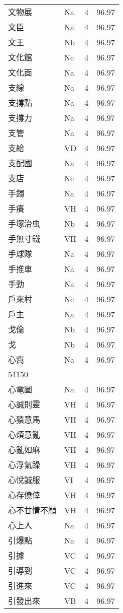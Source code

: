\documentclass[twocolumn]{book}
\begin{document}
\begin{supertabular}{llrr}
文物展 & Na & 4 &  96.97\\
文臣 & Na & 4 &  96.97\\
文王 & Nb & 4 &  96.97\\
文化館 & Nc & 4 &  96.97\\
文化面 & Na & 4 &  96.97\\
支線 & Na & 4 &  96.97\\
支撐點 & Na & 4 &  96.97\\
支撐力 & Na & 4 &  96.97\\
支管 & Na & 4 &  96.97\\
支給 & VD & 4 &  96.97\\
支配國 & Na & 4 &  96.97\\
支店 & Nc & 4 &  96.97\\
手鐲 & Na & 4 &  96.97\\
手癢 & VH & 4 &  96.97\\
手塚治虫 & Nb & 4 &  96.97\\
手無寸鐵 & VH & 4 &  96.97\\
手球隊 & Na & 4 &  96.97\\
手推車 & Na & 4 &  96.97\\
手勁 & Na & 4 &  96.97\\
戶來村 & Nc & 4 &  96.97\\
戶主 & Na & 4 &  96.97\\
戈倫 & Nb & 4 &  96.97\\
戈 & Nb & 4 &  96.97\\
心窩 & Na & 4 &  96.97\\
54150\\
心電圖 & Na & 4 &  96.97\\
心誠則靈 & VH & 4 &  96.97\\
心猿意馬 & VH & 4 &  96.97\\
心煩意亂 & VH & 4 &  96.97\\
心亂如麻 & VH & 4 &  96.97\\
心浮氣躁 & VH & 4 &  96.97\\
心悅誠服 & VI & 4 &  96.97\\
心存僥倖 & VH & 4 &  96.97\\
心不甘情不願 & VH & 4 &  96.97\\
心上人 & Na & 4 &  96.97\\
引爆點 & Na & 4 &  96.97\\
引據 & VC & 4 &  96.97\\
引導到 & VC & 4 &  96.97\\
引進來 & VC & 4 &  96.97\\
引發出來 & VB & 4 &  96.97\\

\end{supertabular}
\end{document}

